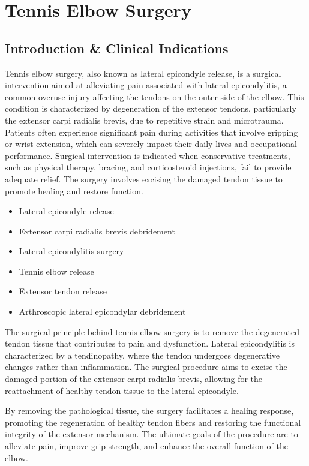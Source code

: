 \chapter{Tennis Elbow Surgery}

\section*{Introduction \& Clinical Indications}
Tennis elbow surgery, also known as lateral epicondyle release, is a surgical intervention aimed at alleviating pain associated with lateral epicondylitis, a common overuse injury affecting the tendons on the outer side of the elbow. This condition is characterized by degeneration of the extensor tendons, particularly the extensor carpi radialis brevis, due to repetitive strain and microtrauma. Patients often experience significant pain during activities that involve gripping or wrist extension, which can severely impact their daily lives and occupational performance. Surgical intervention is indicated when conservative treatments, such as physical therapy, bracing, and corticosteroid injections, fail to provide adequate relief. The surgery involves excising the damaged tendon tissue to promote healing and restore function.

\begin{itemize}
  \item Lateral epicondyle release
  \item Extensor carpi radialis brevis debridement
  \item Lateral epicondylitis surgery
  \item Tennis elbow release
  \item Extensor tendon release
  \item Arthroscopic lateral epicondylar debridement
\end{itemize}

The surgical principle behind tennis elbow surgery is to remove the degenerated tendon tissue that contributes to pain and dysfunction. Lateral epicondylitis is characterized by a tendinopathy, where the tendon undergoes degenerative changes rather than inflammation. The surgical procedure aims to excise the damaged portion of the extensor carpi radialis brevis, allowing for the reattachment of healthy tendon tissue to the lateral epicondyle. 

By removing the pathological tissue, the surgery facilitates a healing response, promoting the regeneration of healthy tendon fibers and restoring the functional integrity of the extensor mechanism. The ultimate goals of the procedure are to alleviate pain, improve grip strength, and enhance the overall function of the elbow.

